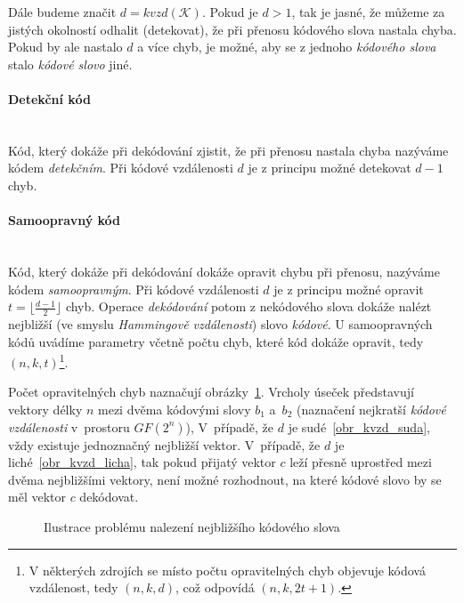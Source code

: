 \documentclass[thesis=M,czech,hidelinks]{FITthesis}[2012/06/26]
\newcommand{\0}{{\textcolor[gray]{0.80}{0}}}
\begin{document}
Dále budeme značit $d = kvzd(\mathcal{K})$. Pokud je $d > 1$, tak je jasné, že
můžeme za jistých okolností odhalit (detekovat), že při přenosu kódového slova
nastala chyba. Pokud by ale nastalo $d$ a více chyb, je možné, aby se z jednoho
\emph{kódového slova} stalo \emph{kódové slovo} jiné.

\paragraph{Detekční kód} \hfil \\
Kód, který dokáže při dekódování zjistit, že při přenosu nastala chyba nazýváme
kódem \emph{detekčním}. Při kódové vzdálenosti $d$ je z principu možné detekovat
$d-1$ chyb.

\paragraph{Samoopravný kód} \hfil \\
Kód, který dokáže při dekódování dokáže opravit chybu při přenosu, nazýváme
kódem \emph{samoopravným}. Při kódové vzdálenosti $d$ je z principu možné
opravit $t = \lfloor \frac{d-1}{2} \rfloor$ chyb. Operace \emph{dekódování}
potom z nekódového slova dokáže nalézt nejbližší (ve smyslu \emph{Hammingově
vzdálenosti}) slovo \emph{kódové}. U samoopravných kódů uvádíme parametry včetně
počtu chyb, které kód dokáže opravit, tedy $(n,k,t)$\footnote{
    V některých zdrojích se místo počtu opravitelných chyb objevuje kódová
    vzdálenost, tedy $(n,k,d)$, což odpovídá $(n,k,2t+1)$.
}.


Počet opravitelných chyb naznačují obrázky~\ref{obr_kvzd}. Vrcholy úseček
představují vektory délky $n$ mezi dvěma kódovými slovy $b_1$ a~$b_2$ (naznačení
nejkratší \emph{kódové vzdálenosti} v~prostoru $GF(2^n)$), V~případě, že $d$ je
sudé~\ref{obr_kvzd_suda}, vždy existuje jednoznačný nejbližší vektor. V~případě,
že $d$ je liché~\ref{obr_kvzd_licha}, tak pokud přijatý vektor $c$ leží přesně
uprostřed mezi dvěma nejbližšími vektory, není možné rozhodnout, na které kódové
slovo by se měl vektor $c$ dekódovat.

\begin{figure}
    \centering
    \quad
    \label{obr_kvzd}
    \caption{Ilustrace problému nalezení nejbližšího kódového slova}
\end{figure}
\end{document}
